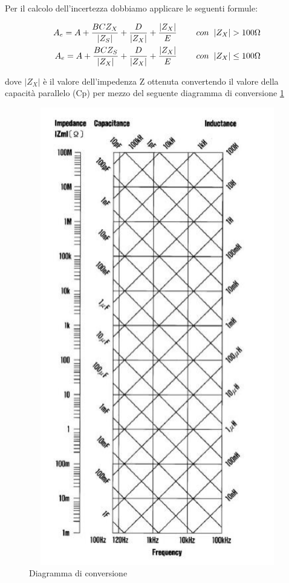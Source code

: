 Per il calcolo dell’incertezza dobbiamo applicare le seguenti formule:

\begin{equation}
\begin{split}
        A_e = A + \frac{BCZ_X}{|Z_S|} + \frac{D}{|Z_X|} + \frac{|Z_X|}{E} \hspace{0,8cm} con \hspace{0,2cm} |Z_X| > 100\Omega \\
        A_e = A + \frac{BCZ_S}{|Z_X|} + \frac{D}{|Z_X|} + \frac{|Z_X|}{E} \hspace{0,8cm} con \hspace{0,2cm} |Z_X| \leq 100\Omega
\end{split}
\end{equation}

dove $|Z_X|$ è il valore dell'impedenza Z ottenuta convertendo il valore della capacità parallelo (Cp) per mezzo del seguente diagramma di conversione \ref{fig:diag_conv_Cp}
\clearpage

\begin{figure}[H]
    \centering
    \includegraphics[height=20cm, width=12cm]{media/diagramma_conversione_Cp.png}
    \caption{Diagramma di conversione}
    \label{fig:diag_conv_Cp}
\end{figure}
\FloatBarrier
\clearpage

